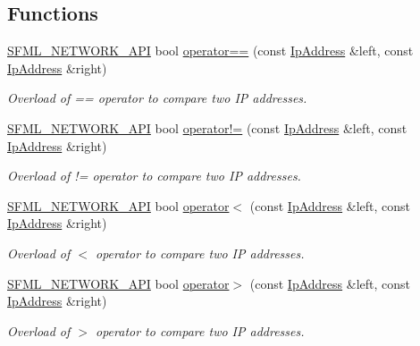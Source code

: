 \subsection*{Functions}
\begin{DoxyCompactItemize}
\item 
\hyperlink{_network_2_export_8hpp_ac5d46d4ffd98e947e28c54d051b338e7}{S\-F\-M\-L\-\_\-\-N\-E\-T\-W\-O\-R\-K\-\_\-\-A\-P\-I} bool \hyperlink{namespacesf_ac911326160206c1038ceff6face28b89}{operator==} (const \hyperlink{classsf_1_1_ip_address}{Ip\-Address} \&left, const \hyperlink{classsf_1_1_ip_address}{Ip\-Address} \&right)
\begin{DoxyCompactList}\small\item\em Overload of == operator to compare two I\-P addresses. \end{DoxyCompactList}\item 
\hyperlink{_network_2_export_8hpp_ac5d46d4ffd98e947e28c54d051b338e7}{S\-F\-M\-L\-\_\-\-N\-E\-T\-W\-O\-R\-K\-\_\-\-A\-P\-I} bool \hyperlink{namespacesf_ad68fc42c15ea415b59023a4a277f8946}{operator!=} (const \hyperlink{classsf_1_1_ip_address}{Ip\-Address} \&left, const \hyperlink{classsf_1_1_ip_address}{Ip\-Address} \&right)
\begin{DoxyCompactList}\small\item\em Overload of != operator to compare two I\-P addresses. \end{DoxyCompactList}\item 
\hyperlink{_network_2_export_8hpp_ac5d46d4ffd98e947e28c54d051b338e7}{S\-F\-M\-L\-\_\-\-N\-E\-T\-W\-O\-R\-K\-\_\-\-A\-P\-I} bool \hyperlink{namespacesf_a62e90a478e790defc429ecd94ad67ab3}{operator$<$} (const \hyperlink{classsf_1_1_ip_address}{Ip\-Address} \&left, const \hyperlink{classsf_1_1_ip_address}{Ip\-Address} \&right)
\begin{DoxyCompactList}\small\item\em Overload of $<$ operator to compare two I\-P addresses. \end{DoxyCompactList}\item 
\hyperlink{_network_2_export_8hpp_ac5d46d4ffd98e947e28c54d051b338e7}{S\-F\-M\-L\-\_\-\-N\-E\-T\-W\-O\-R\-K\-\_\-\-A\-P\-I} bool \hyperlink{namespacesf_a7344fe65b9ee438bab496c9889a34202}{operator$>$} (const \hyperlink{classsf_1_1_ip_address}{Ip\-Address} \&left, const \hyperlink{classsf_1_1_ip_address}{Ip\-Address} \&right)
\begin{DoxyCompactList}\small\item\em Overload of $>$ operator to compare two I\-P addresses. \end{DoxyCompactList}\item 

\end{DoxyCompactItemize}

